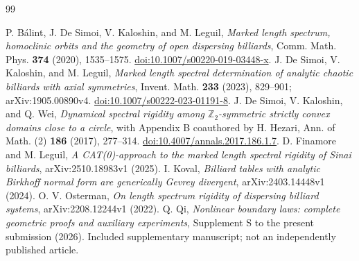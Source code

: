 \begin{thebibliography}{99}
\raggedright
{}
P. B\'alint, J. De Simoi, V. Kaloshin, and M. Leguil,
\emph{Marked length spectrum, homoclinic orbits and the geometry of open
dispersing billiards}, Comm. Math. Phys. \textbf{374} (2020), 1535--1575.
\href{https://doi.org/10.1007/s00220-019-03448-x}{doi:10.1007/s00220-019-03448-x}.
J. De Simoi, V. Kaloshin, and M. Leguil,
\emph{Marked length spectral determination of analytic chaotic billiards
with axial symmetries}, Invent. Math. \textbf{233} (2023), 829--901;
arXiv:1905.00890v4.
\href{https://doi.org/10.1007/s00222-023-01191-8}{doi:10.1007/s00222-023-01191-8}.
J. De Simoi, V. Kaloshin, and Q. Wei,
\emph{Dynamical spectral rigidity among $\mathbb Z_2$-symmetric strictly
convex domains close to a circle}, with Appendix B coauthored by H. Hezari,
Ann. of Math. (2) \textbf{186} (2017), 277--314.
\href{https://doi.org/10.4007/annals.2017.186.1.7}{doi:10.4007/annals.2017.186.1.7}.
D. Finamore and M. Leguil,
\emph{A CAT(0)-approach to the marked length spectral rigidity of Sinai
billiards}, arXiv:2510.18983v1 (2025).
I. Koval, \emph{Billiard tables with analytic Birkhoff normal form are
generically Gevrey divergent}, arXiv:2403.14448v1 (2024).
O. V. Osterman, \emph{On length spectrum rigidity of dispersing billiard
systems}, arXiv:2208.12244v1 (2022).
Q. Qi, \emph{Nonlinear boundary laws: complete geometric proofs and
auxiliary experiments}, Supplement S to the present submission (2026).
Included supplementary manuscript; not an independently published article.
\end{thebibliography}
